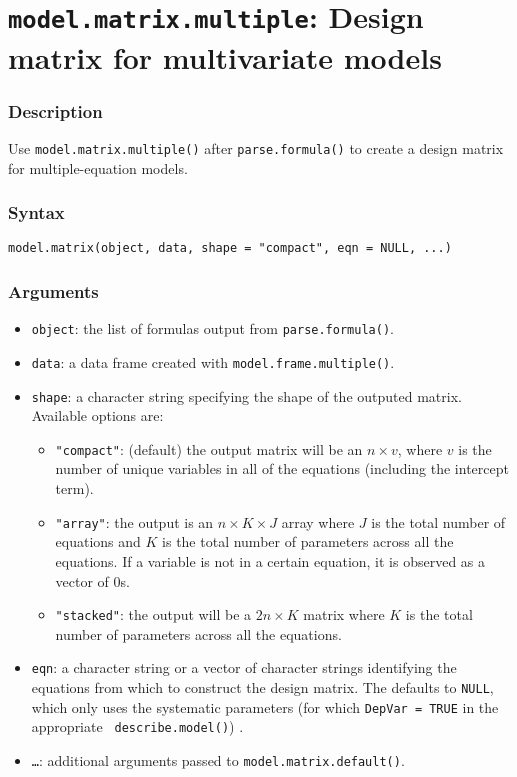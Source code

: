\section{{\tt model.matrix.multiple}: Design matrix for multivariate models}
\label{model.matrix.multiple}

\subsubsection{Description}
Use {\tt model.matrix.multiple()} after {\tt parse.formula()} to
create a design matrix for multiple-equation models.  
  
\subsubsection{Syntax}
\begin{verbatim}
model.matrix(object, data, shape = "compact", eqn = NULL, ...)
\end{verbatim}

\subsubsection{Arguments}
\begin{itemize}
  \item {\tt object}: the list of formulas output from \texttt{parse.formula()}.
  \item {\tt data}: a data frame created with {\tt model.frame.multiple()}. 
 \item {\tt shape}: a character string specifying the shape of the
 outputed matrix.  Available options are:  

\begin{itemize} 

\item {\tt "compact"}: (default) the output matrix will be an $n \times v$,
where $v$ is the number of unique variables in all of the equations
(including the intercept term). 

\item {\tt "array"}: the output is an $n \times K \times J$ array where $J$ is the
total number of equations and $K$ is the total number of parameters
across all the equations.  If a variable is not in a certain equation,
it is observed as a vector of 0s. 

\item {\tt "stacked"}: the output will be a $2n \times K$ matrix where $K$ is the total number of parameters across all the equations.

\end{itemize}
  
  \item {\tt eqn}: a character string or a vector of character
  strings identifying the equations from which to construct the design
  matrix. The defaults to {\tt NULL}, which only uses the systematic
  parameters (for which {\tt DepVar = TRUE} in the appropriate {\tt
describe.model()}) .  
\item {\tt \dots}:  additional arguments passed to {\tt model.matrix.default()}.  
\end{itemize}

